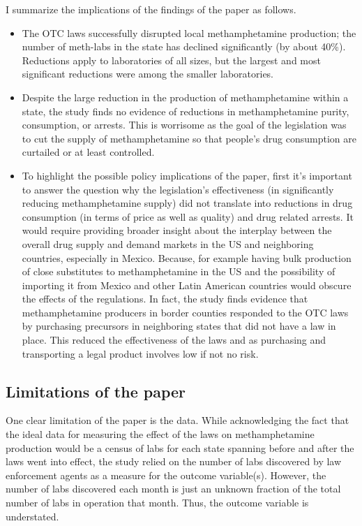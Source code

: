 \documentclass[
  11pt,
]{article}
\begin{document}
I summarize the implications of the findings of the paper as follows.

\begin{itemize}
\item
  The OTC laws successfully disrupted local methamphetamine production;
  the number of meth-labs in the state has declined significantly (by
  about 40\%). Reductions apply to laboratories of all sizes, but the
  largest and most significant reductions were among the smaller
  laboratories.
\item
  Despite the large reduction in the production of methamphetamine
  within a state, the study finds no evidence of reductions in
  methamphetamine purity, consumption, or arrests. This is worrisome as
  the goal of the legislation was to cut the supply of methamphetamine
  so that people's drug consumption are curtailed or at least
  controlled.
\item
  To highlight the possible policy implications of the paper, first it's
  important to answer the question why the legislation's effectiveness
  (in significantly reducing methamphetamine supply) did not translate
  into reductions in drug consumption (in terms of price as well as
  quality) and drug related arrests. It would require providing broader
  insight about the interplay between the overall drug supply and demand
  markets in the US and neighboring countries, especially in Mexico.
  Because, for example having bulk production of close substitutes to
  methamphetamine in the US and the possibility of importing it from
  Mexico and other Latin American countries would obscure the effects of
  the regulations. In fact, the study finds evidence that
  methamphetamine producers in border counties responded to the OTC laws
  by purchasing precursors in neighboring states that did not have a law
  in place. This reduced the effectiveness of the laws and as purchasing
  and transporting a legal product involves low if not no risk.
\end{itemize}

\hypertarget{limitations-of-the-paper}{%
\subsection*{Limitations of the paper}\label{limitations-of-the-paper}}

One clear limitation of the paper is the data. While acknowledging the
fact that the ideal data for measuring the effect of the laws on
methamphetamine production would be a census of labs for each state
spanning before and after the laws went into effect, the study relied on
the number of labs discovered by law enforcement agents as a measure for
the outcome variable(s). However, the number of labs discovered each
month is just an unknown fraction of the total number of labs in
operation that month. Thus, the outcome variable is understated.
\end{document}
